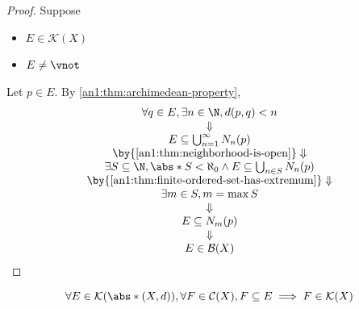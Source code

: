 \begin{proof}
  Suppose
  \begin{itemize}
    \item $E \in \mathcal{K}(X)$
    \item $E \neq \vnot$
  \end{itemize}
  Let $p \in E$. By \cref{an1:thm:archimedean-property},
  \[
    \begin{array}{c}
      \forall q \in E, \exists n \in \N, d(p, q) < n                                             \\
      \Downarrow                                                                                 \\
      E \subseteq \bigcup_{n = 1}^{\infty} N_{n}(p)                                              \\
      \by{\Cref{an1:thm:neighborhood-is-open}} \Downarrow                                        \\
      \exists S \subseteq \N, \abs*{S} < \aleph_{0} \land E \subseteq \bigcup_{n \in S} N_{n}(p) \\
      \by{\Cref{an1:thm:finite-ordered-set-has-extremum}} \Downarrow                             \\
      \exists m \in S, m = \max S                                                                \\
      \Downarrow                                                                                 \\
      E \subseteq N_{m}(p)                                                                       \\
      \Downarrow                                                                                 \\
      E \in \mathcal{B}(X)
    \end{array}
  \]
\end{proof}

\begin{theorem} \label{an1:thm:closed-subset-of-compact-set-is-compact}
  \[
    \forall E \in \mathcal{K}(\abs*{(X, d)}), \forall F \in \mathcal{C}(X), F \subseteq E \implies F \in \mathcal{K}(X)
  \]
\end{theorem}

